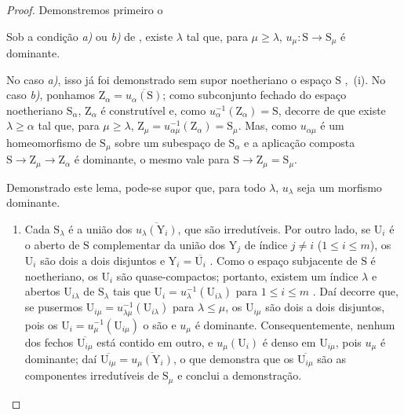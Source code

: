 \begin{proof}
Demonstremos primeiro o

\begin{lemma}[8.4.2.1]
\label{IV.8.4.2.1}
Sob a condição \emph{a)} ou \emph{b)} de , existe $\lambda$ tal que, para $\mu\geqslant\lambda$, $u_\mu:\mathrm{S}\to\mathrm{S}_\mu$ é dominante.
\end{lemma}

No caso \emph{a)}, isso já foi demonstrado sem supor noetheriano o espaço $\mathrm{S}$ ,~(i).
No caso \emph{b)}, ponhamos $\mathrm{Z}_\alpha=\overline{u_\alpha(\mathrm{S})}$; como subconjunto fechado do espaço noetheriano $\mathrm{S}_\alpha$, $\mathrm{Z}_\alpha$ é construtível e, como $u_\alpha^{-1}(\mathrm{Z}_\alpha)=\mathrm{S}$, decorre de  que existe $\lambda\geqslant\alpha$ tal que, para $\mu\geqslant\lambda$, $\mathrm{Z}_\mu=u_{\alpha\mu}^{-1}(\mathrm{Z}_\alpha)=\mathrm{S}_\mu$.
Mas, como $u_{\alpha\mu}$ é um homeomorfismo de $\mathrm{S}_\mu$ sobre um subespaço de $\mathrm{S}_\alpha$ e a aplicação composta $\mathrm{S}\to\mathrm{Z}_\mu\to\mathrm{Z}_\alpha$ é dominante, o mesmo vale para $\mathrm{S}\to\mathrm{Z}_\mu=\mathrm{S}_\mu$.

Demonstrado este lema, pode-se supor que, para todo $\lambda$, $u_\lambda$ seja um morfismo dominante.
\begin{enumerate}[label=(\roman*)]
  \item Cada $\mathrm{S}_\lambda$ é a união dos $\overline{u_\lambda(\mathrm{Y}_i)}$, que são irredutíveis.
Por outro lado, se $\mathrm{U}_i$ é o aberto de $\mathrm{S}$ complementar da união dos $\mathrm{Y}_j$ de índice $j\neq i$ ($1\leqslant i\leqslant m$), os $\mathrm{U}_i$ são dois a dois disjuntos e $\mathrm{Y}_i=\overline{\mathrm{U}_i}$ .
Como o espaço subjacente de $\mathrm{S}$ é noetheriano, os $\mathrm{U}_i$ são quase-compactos; portanto, existem um índice $\lambda$ e abertos $\mathrm{U}_{i\lambda}$ de $\mathrm{S}_\lambda$ tais que $\mathrm{U}_i=u_\lambda^{-1}(\mathrm{U}_{i\lambda})$ para $1\leqslant i\leqslant m$ .
Daí decorre que, se pusermos $\mathrm{U}_{i\mu}=u_{\lambda\mu}^{-1}(\mathrm{U}_{i\lambda})$ para $\lambda\leqslant\mu$, os $\mathrm{U}_{i\mu}$ são dois a dois disjuntos, pois os $\mathrm{U}_i=u_\mu^{-1}(\mathrm{U}_{i\mu})$ o são e $u_\mu$ é dominante.
Consequentemente, nenhum dos fechos $\overline{\mathrm{U}_{i\mu}}$ está contido em outro, e $u_\mu(\mathrm{U}_i)$ é denso em $\mathrm{U}_{i\mu}$, pois $u_\mu$ é dominante; daí $\overline{\mathrm{U}_{i\mu}}=\overline{u_\mu(\mathrm{Y}_i)}$, o que demonstra que os $\overline{\mathrm{U}_{i\mu}}$ são as componentes irredutíveis de $\mathrm{S}_\mu$  e conclui a demonstração.


\end{enumerate}
\end{proof}
